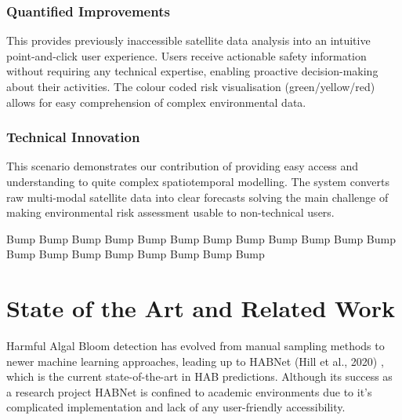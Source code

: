 \documentclass[conference]{IEEEtran}
\begin{document}
\subsubsection{Quantified Improvements}
This provides previously inaccessible satellite data analysis into an intuitive point-and-click user experience. Users receive actionable safety information without requiring any technical expertise, enabling proactive decision-making about their activities. The colour coded risk visualisation (green/yellow/red) allows for easy comprehension of complex environmental data.
\subsubsection{Technical Innovation}
This scenario demonstrates our contribution of providing easy access and understanding to quite complex spatiotemporal modelling. The system converts raw multi-modal satellite data into clear forecasts solving the main challenge of making environmental risk assessment usable to non-technical users.


Bump
\newline
Bump
\newline
Bump
\newline
Bump
\newline
Bump
\newline
Bump
\newline
Bump
\newline
Bump
\newline
Bump
\newline
Bump
\newline
Bump
\newline
Bump
\newline
Bump
\newline
Bump
\newline
Bump
\newline
Bump
\newline
Bump
\newline
Bump
\newline
Bump
\newline
Bump


\section{State of the Art and Related Work}
Harmful Algal Bloom detection has evolved from manual sampling methods to newer machine learning approaches, leading up to HABNet (Hill et al., 2020) \cite{b1}, which is the current state-of-the-art in HAB predictions. Although its success as a research project HABNet is confined to academic environments due to it's complicated implementation and lack of any user-friendly accessibility.
\end{document}
